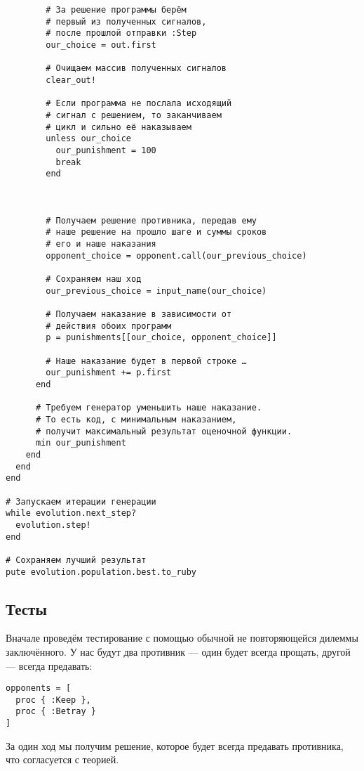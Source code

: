 \documentclass[utf8,a5paper,portrait,10pt,twoside]{eskdtext}
\begin{document}
\begin{verbatim}
        # За решение программы берём
        # первый из полученных сигналов,
        # после прошлой отправки :Step
        our_choice = out.first
        
        # Очищаем массив полученных сигналов
        clear_out!
        
        # Если программа не послала исходящий
        # сигнал с решением, то заканчиваем
        # цикл и сильно её наказываем
        unless our_choice
          our_punishment = 100
          break
        end
        
        
        
        # Получаем решение противника, передав ему
        # наше решение на прошло шаге и суммы сроков
        # его и наше наказания
        opponent_choice = opponent.call(our_previous_choice)
        
        # Сохраняем наш ход
        our_previous_choice = input_name(our_choice)
        
        # Получаем наказание в зависимости от
        # действия обоих программ
        p = punishments[[our_choice, opponent_choice]]
        
        # Наше наказание будет в первой строке …
        our_punishment += p.first
      end
      
      # Требуем генератор уменьшить наше наказание.
      # То есть код, с минимальным наказанием,
      # получит максимальный результат оценочной функции.
      min our_punishment
    end
  end
end

# Запускаем итерации генерации
while evolution.next_step?
  evolution.step!
end

# Сохраняем лучший результат
pute evolution.population.best.to_ruby
\end{verbatim}

\subsection{Тесты}

Вначале проведём тестирование с помощью обычной не повторяющейся дилеммы
заключённого. У нас будут два противник — один будет всегда прощать, другой —
всегда предавать:

\begin{verbatim}
opponents = [
  proc { :Keep },
  proc { :Betray }
]
\end{verbatim}

За один ход мы получим решение, которое будет всегда предавать противника,
что согласуется с теорией.
\end{document}
